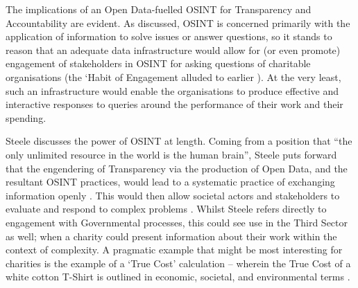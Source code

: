 The implications of an Open Data-fuelled OSINT for Transparency and Accountability are evident. As discussed, OSINT is concerned primarily with the application of information to solve issues or answer questions, so it stands to reason that an adequate data infrastructure would allow for (or even promote) engagement of stakeholders in OSINT for asking questions of charitable organisations (the `Habit of Engagement alluded to earlier \cite{gordon_making_2013-1}). At the very least, such an infrastructure would enable the organisations to produce effective and interactive responses to queries around the performance of their work and their spending.

Steele discusses the power of OSINT at length. Coming from a position that ``the only unlimited resource in the world is the human brain'', Steele puts forward that the engendering of Transparency via the production of Open Data, and the resultant OSINT practices, would lead to a systematic practice of exchanging information openly \cite{steele_open-source_2012}. This would then allow societal actors and stakeholders to evaluate and respond to complex problems \cite{steele_open-source_2012}. Whilst Steele refers directly to engagement with Governmental processes, this could see use in the Third Sector as well; when a charity could present information about their work within the context of complexity. A pragmatic example that might be most interesting for charities is the example of a `True Cost' calculation --  wherein the True Cost of a white cotton T-Shirt is outlined in economic, societal, and environmental terms \cite{steele_open-source_2012}.

